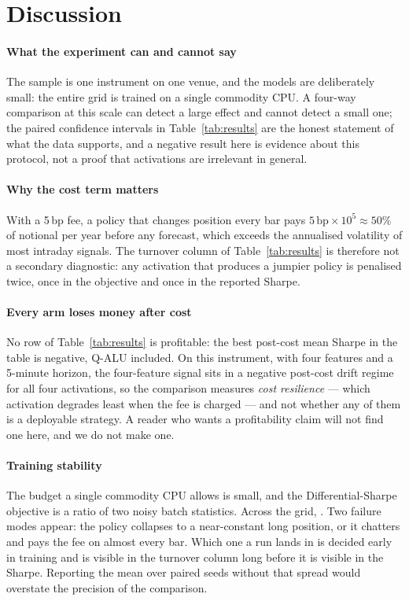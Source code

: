 \documentclass[conference]{IEEEtran}
\begin{document}
\section{Discussion}

\paragraph{What the experiment can and cannot say}
The sample is one instrument on one venue, and the models are deliberately
small: the entire grid is trained on a single commodity CPU. A four-way
comparison at this scale can detect a large effect and cannot detect a small
one; the paired confidence intervals in Table~\ref{tab:results} are the honest
statement of what the data supports, and a negative result here is evidence about
this protocol, not a proof that activations are irrelevant in general.

\paragraph{Why the cost term matters}
With a 5\,bp fee, a policy that changes position every bar pays
$5\,\mathrm{bp}\times 10^5\approx50\%$ of notional per year before any
forecast, which exceeds the annualised volatility of most intraday signals. The
turnover column of Table~\ref{tab:results} is therefore not a secondary
diagnostic: any activation that produces a jumpier policy is penalised twice,
once in the objective and once in the reported Sharpe.

\paragraph{Every arm loses money after cost}
No row of Table~\ref{tab:results} is profitable: the best post-cost mean Sharpe
in the table is negative, Q-ALU included. On this instrument, with four features
and a 5-minute horizon, the four-feature signal sits in a negative post-cost
drift regime for all four activations, so the comparison measures
\emph{cost resilience} --- which activation degrades least when the fee is
charged --- and not whether any of them is a deployable strategy. A reader who
wants a profitability claim will not find one here, and we do not make one.

\paragraph{Training stability}
The budget a single commodity CPU allows is small, and the Differential-Sharpe
objective is a ratio of two noisy batch statistics. Across the grid,
\spreadSentence{}. Two failure modes appear: the policy collapses to a
near-constant long position, or it chatters and pays the fee on almost every
bar. Which one a run lands in is decided early in training and is visible in the
turnover column long before it is visible in the Sharpe. Reporting the mean over
paired seeds without that spread would overstate the precision of the comparison.
\end{document}
